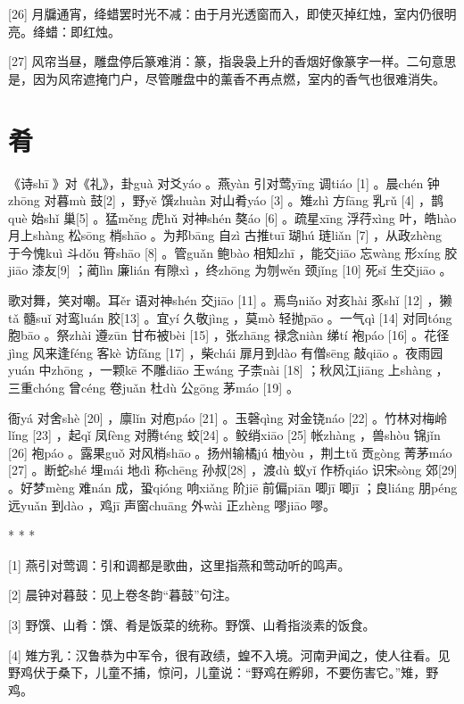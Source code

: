 \documentclass[12pt,UTF8]{ctexbook}
\begin{document}
[26] 月牖通宵，绛蜡罢时光不减：由于月光透窗而入，即使灭掉红烛，室内仍很明亮。绛蜡：即红烛。

[27] 风帘当昼，雕盘停后篆难消：篆，指袅袅上升的香烟好像篆字一样。二句意思是，因为风帘遮掩门户，尽管雕盘中的薰香不再点燃，室内的香气也很难消失。





\chapter{肴}


《诗shī 》对《礼》，卦guà 对爻yáo 。燕yàn 引对莺yīng 调tiáo [1] 。晨chén 钟zhōng 对暮mù 鼓[2] ，野yě 馔zhuàn 对山肴yáo [3] 。雉zhì 方fāng 乳rǔ [4] ，鹊què 始shǐ 巢[5] 。猛měng 虎hǔ 对神shén 獒áo [6] 。疏星xīng 浮荇xìng 叶，皓hào 月上shàng 松sōng 梢shāo 。为邦bāng 自zì 古推tuī 瑚hú 琏liǎn [7] ，从政zhèng 于今愧kuì 斗dǒu 筲shāo [8] 。管guǎn 鲍bào 相知zhī ，能交jiāo 忘wàng 形xíng 胶jiāo 漆友[9] ；蔺lìn 廉lián 有隙xì ，终zhōng 为刎wěn 颈jǐng [10] 死sǐ 生交jiāo 。

歌对舞，笑对嘲。耳ěr 语对神shén 交jiāo [11] 。焉鸟niǎo 对亥hài 豕shǐ [12] ，獭tǎ 髓suǐ 对鸾luán 胶[13] 。宜yí 久敬jìng ，莫mò 轻抛pāo 。一气qì [14] 对同tóng 胞bāo 。祭zhài 遵zūn 甘布被bèi [15] ，张zhāng 禄念niàn 绨tí 袍páo [16] 。花径jìng 风来逢féng 客kè 访fǎng [17] ，柴chái 扉月到dào 有僧sēng 敲qiāo 。夜雨园yuán 中zhōng ，一颗kē 不雕diāo 王wáng 子柰nài [18] ；秋风江jiāng 上shàng ，三重chóng 曾céng 卷juǎn 杜dù 公gōng 茅máo [19] 。

衙yá 对舍shè [20] ，廪lǐn 对庖páo [21] 。玉磬qìng 对金铙náo [22] 。竹林对梅岭lǐng [23] ，起qǐ 凤fèng 对腾téng 蛟[24] 。鲛绡xiāo [25] 帐zhàng ，兽shòu 锦jǐn [26] 袍páo 。露果guǒ 对风梢shāo 。扬州输橘jú 柚yòu ，荆土tǔ 贡gòng 菁茅máo [27] 。断蛇shé 埋mái 地dì 称chēng 孙叔[28] ，渡dù 蚁yǐ 作桥qiáo 识宋sòng 郊[29] 。好梦mèng 难nán 成，蛩qióng 响xiǎng 阶jiē 前偏piān 唧jī 唧jī ；良liáng 朋péng 远yuǎn 到dào ，鸡jī 声窗chuāng 外wài 正zhèng 嘐jiāo 嘐。



* * *



[1] 燕引对莺调：引和调都是歌曲，这里指燕和莺动听的鸣声。

[2] 晨钟对暮鼓：见上卷冬韵“暮鼓”句注。

[3] 野馔、山肴：馔、肴是饭菜的统称。野馔、山肴指淡素的饭食。

[4] 雉方乳：汉鲁恭为中军令，很有政绩，蝗不入境。河南尹闻之，使人往看。见野鸡伏于桑下，儿童不捕，惊问，儿童说：“野鸡在孵卵，不要伤害它。”雉，野鸡。
\end{document}
